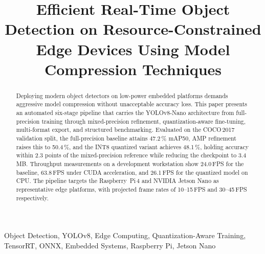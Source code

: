 \documentclass[conference]{IEEEtran}
\begin{document}
\title{Efficient Real-Time Object Detection on Resource-Constrained Edge Devices Using Model Compression Techniques}

\author{
\centering
{}
}


\maketitle

\begin{abstract}
Deploying modern object detectors on low-power embedded platforms demands aggressive model compression without unacceptable accuracy loss. This paper presents an automated six-stage pipeline that carries the YOLOv8-Nano architecture from full-precision training through mixed-precision refinement, quantization-aware fine-tuning, multi-format export, and structured benchmarking. Evaluated on the COCO\,2017 validation split, the full-precision baseline attains 47.2\,\% mAP50, AMP refinement raises this to 50.4\,\%, and the INT8 quantized variant achieves 48.1\,\%, holding accuracy within 2.3 points of the mixed-precision reference while reducing the checkpoint to 3.4\,MB. Throughput measurements on a development workstation show 24.0\,FPS for the baseline, 63.8\,FPS under CUDA acceleration, and 26.1\,FPS for the quantized model on CPU. The pipeline targets the Raspberry~Pi\,4 and NVIDIA Jetson Nano as representative edge platforms, with projected frame rates of 10--15\,FPS and 30--45\,FPS respectively.
\end{abstract}

\begin{IEEEkeywords}
Object Detection, YOLOv8, Edge Computing, Quantization-Aware Training, TensorRT, ONNX, Embedded Systems, Raspberry Pi, Jetson Nano
\end{IEEEkeywords}
\end{document}
